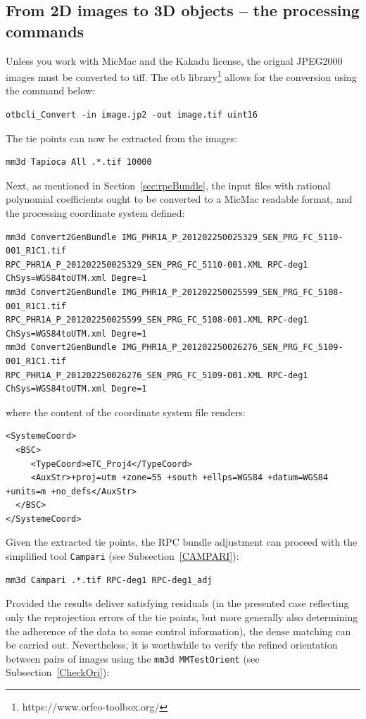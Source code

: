 \subsection{From 2D images to 3D objects -- the processing commands}
%
Unless you work with MicMac and the Kakadu license, the orignal JPEG2000 images must be  converted to tiff. The otb library\footnote{https://www.orfeo-toolbox.org/} allows for the conversion using the command below: 
\begin{verbatim}
otbcli_Convert -in image.jp2 -out image.tif uint16
\end{verbatim}
%
The tie points can now be extracted from the images:
\begin{verbatim}
mm3d Tapioca All .*.tif 10000  
\end{verbatim}
%
Next, as mentioned in Section~\ref{sec:rpcBundle}, the input files with rational polynomial coefficients ought to be converted to a MicMac readable format, and the processing coordinate system defined:
\begin{verbatim}
mm3d Convert2GenBundle IMG_PHR1A_P_201202250025329_SEN_PRG_FC_5110-001_R1C1.tif
RPC_PHR1A_P_201202250025329_SEN_PRG_FC_5110-001.XML RPC-deg1 ChSys=WGS84toUTM.xml Degre=1
mm3d Convert2GenBundle IMG_PHR1A_P_201202250025599_SEN_PRG_FC_5108-001_R1C1.tif
RPC_PHR1A_P_201202250025599_SEN_PRG_FC_5108-001.XML RPC-deg1 ChSys=WGS84toUTM.xml Degre=1
mm3d Convert2GenBundle IMG_PHR1A_P_201202250026276_SEN_PRG_FC_5109-001_R1C1.tif
RPC_PHR1A_P_201202250026276_SEN_PRG_FC_5109-001.XML RPC-deg1 ChSys=WGS84toUTM.xml Degre=1
\end{verbatim}
%
where the content of the coordinate system file renders:
\begin{verbatim}
<SystemeCoord>
  <BSC>
     <TypeCoord>eTC_Proj4</TypeCoord>
     <AuxStr>+proj=utm +zone=55 +south +ellps=WGS84 +datum=WGS84 +units=m +no_defs</AuxStr>
  </BSC>
</SystemeCoord> 
\end{verbatim}
%
Given the extracted tie points, the RPC bundle adjustment can proceed with the simplified tool {\tt Campari} (see Subsection~\ref{CAMPARI}):
\begin{verbatim}
mm3d Campari .*.tif RPC-deg1 RPC-deg1_adj
\end{verbatim}
%
Provided the results deliver satisfying residuals (in the presented case reflecting only the reprojection errors of the tie points, but more generally also determining the adherence of the data to some control information), the dense matching can be carried out. Nevertheless, it is worthwhile to verify the refined orientation between pairs of images using the {\tt mm3d MMTestOrient} (see Subsection~\ref{CheckOri}):
